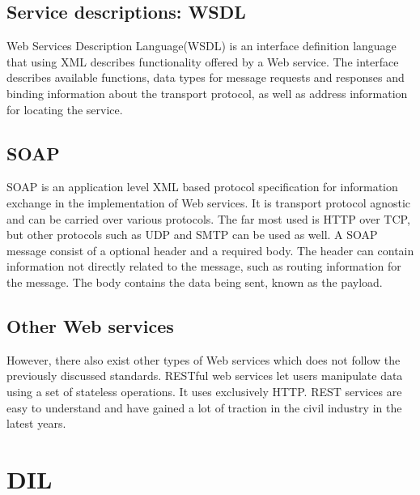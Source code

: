\documentclass[USenglish]{ifimaster}
\begin{document}
\subsection{Service descriptions: WSDL}
Web Services Description Language(WSDL) is an interface definition language that
using XML describes functionality offered by a Web service. The interface
describes available functions, data types for message requests and responses and
binding information about the transport protocol, as well as address information
for locating the service.
\subsection{SOAP}
SOAP is an application level XML based protocol specification for information
exchange in the implementation of Web services. It is transport protocol
agnostic and can be carried over various protocols. The far most used is HTTP
over TCP, but other protocols such as UDP and SMTP can be used as well.
A SOAP message consist of a optional header and a required body. The header can
contain information not directly related to the message, such as routing
information for the message. The body contains the data being sent, known as the
payload.
\subsection{Other Web services}
However, there also exist other types of Web services which does not follow the
previously discussed standards. RESTful web services let users manipulate data
using a set of stateless operations. It uses exclusively HTTP. REST services are
easy to understand and have gained a lot of traction in the civil industry in
the latest years.


\section{DIL}
\label{dil}
\end{document}
